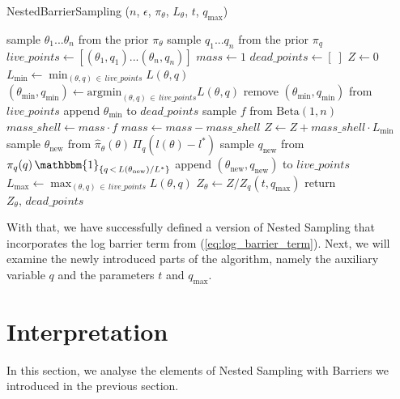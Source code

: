 \documentclass[12pt, a4paper]{report}
\begin{document}
\begin{algorithm}
    \caption[Nested Sampling with the log barrier term.]{NestedBarrierSampling ($n$, $\epsilon$, $\pi_\theta$, $L_\theta$, $t$, $q_{\textrm{max}}$)}
    \label{alg:barriersampling}
    \begin{algorithmic}
        \State sample $\theta_1 ... \theta_n$ from the prior $\pi_\theta$
        \State sample $q_1 ... q_n$ from the prior $\pi_q$
        \State $live\_points \gets [ (\theta_1, q_1) ... (\theta_n, q_n) ]$
        \State $mass \gets 1$
        \State $dead\_points \gets [ \; ]$
        \State $Z \gets 0$
        \Repeat
            \State $L_{\textrm{min}} \gets \min_{(\theta,q) \, \in \, live\_points} L(\theta, q)$ 
            \State $(\theta_{\textrm{min}}, q_{\textrm{min}}) \gets \textrm{argmin}_{(\theta,q) \, \in \, live\_points} L(\theta, q)$ 
            \State remove $(\theta_{\textrm{min}}, q_{\textrm{min}})$ from $live\_points$
            \State append $\theta_{\textrm{min}}$ to $dead\_points$
            \State sample $f$ from  $\textrm{Beta}(1, n)$
            \State $mass\_shell \gets mass \cdot f$
            \State $mass \gets mass - mass\_shell$
            \State $Z \gets Z + mass\_shell \cdot L_{\textrm{min}}$
            \State sample $\theta_{\textrm{new}}$ from $\hat{\pi}_\theta(\theta) \, \Pi_q(l(\theta) - l^*)$
            \State sample $q_{\textrm{new}}$ from $\pi_q(q) \, \mathbbm{1}_{\{q \,<\, L(\theta_{\textrm{new}}) / L^*\}}$
            \State append $(\theta_{\textrm{new}}, q_{\textrm{new}})$ to $live\_points$
            \State $L_{\textrm{max}} \gets \max_{(\theta,q) \, \in \, live\_points} L(\theta, q)$ 
        \State $Z_\theta \gets Z / Z_q(t, q_{\textrm{max}})$
        \State return $Z_\theta,\, dead\_points$
    \end{algorithmic}
\end{algorithm}

With that, we have successfully defined a version of Nested Sampling that incorporates the log barrier term from (\ref{eq:log_barrier_term}).
Next, we will examine the newly introduced parts of the algorithm, namely the auxiliary variable $q$ and the parameters $t$ and $q_{\textrm{max}}$.

\section{Interpretation}
In this section, we analyse the elements of Nested Sampling with Barriers we introduced in the previous section.
\end{document}
